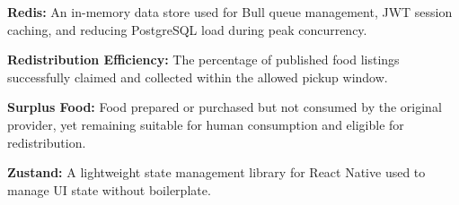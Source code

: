 \documentclass[conference]{IEEEtran}
\begin{document}
\textbf{Redis:} An in-memory data store used for Bull queue management, JWT session caching, and reducing PostgreSQL load during peak concurrency.

\textbf{Redistribution Efficiency:} The percentage of published food listings successfully claimed and collected within the allowed pickup window.

\textbf{Surplus Food:} Food prepared or purchased but not consumed by the original provider, yet remaining suitable for human consumption and eligible for redistribution.

\textbf{Zustand:} A lightweight state management library for React Native used to manage UI state without boilerplate.
\end{document}
